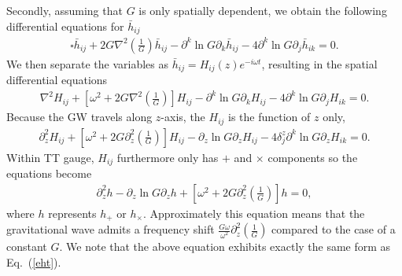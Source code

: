 \documentclass[prd,aps,a4paper,superscriptaddress,onecolumn,nofootinbib]{revtex4}
\begin{document}
Secondly, assuming that $G$ is only spatially dependent, we obtain the following differential equations for $\bar{h}_{ij}$
\begin{equation}
\begin{aligned}
\square \bar{h}_{ij} + 2G\nabla^2 \left(\frac{1}{G}\right) \bar{h}_{ij} - \partial^k \ln G \partial_k \bar{h}_{ij} - 4\partial^k \ln G\partial_j \bar{h}_{ik} = 0.
\end{aligned}
\end{equation}
We then separate the variables as $\bar{h}_{ij} = H_{ij}(z)e^{-i\omega t}$, resulting in the spatial differential equations
\begin{equation}
\begin{aligned}
\nabla^2H_{ij} + \left[ \omega^2 + 2G\nabla^2 \left(\frac{1}{G}\right)\right]H_{ij} - \partial^k \ln G \partial_k H_{ij} - 4\partial^k \ln G\partial_j H_{ik} = 0.
\end{aligned}
\end{equation}
Because the GW travels along $z$-axis, the $H_{ij}$ is the function of $z$ only,
\begin{equation}
\begin{aligned}
    \partial_z^2 H_{ij} + \left[ \omega^2 + 2G\partial_z^2 \left(\frac{1}{G}\right) \right]H_{ij} - \partial_z \ln G \partial_z H_{ij} - 4\delta^z_j\partial^k \ln G\partial_z H_{ik} = 0.
\end{aligned}
\end{equation}
Within TT gauge, $H_{ij}$ furthermore only has $+$ and $\times$ components so the equations become
\begin{equation}\label{ehz}
\begin{aligned}
    \partial_z^2 h- \partial_z \ln G\partial_z h + \left[\omega^2 + 2G\partial_z^2 \left(\frac{1}{G}\right) \right]h  = 0,
\end{aligned}
\end{equation}
where $h$ represents $h_+$ or $h_\times$.
Approximately this equation means that the gravitational wave admits a frequency shift $\frac{G\omega}{\omega^2}\partial_z^2\left(\frac{1}{G}\right)$ compared to the case of a constant $G$.
We note that the above equation exhibits exactly the same form as Eq.~(\ref{eht}).
\end{document}
